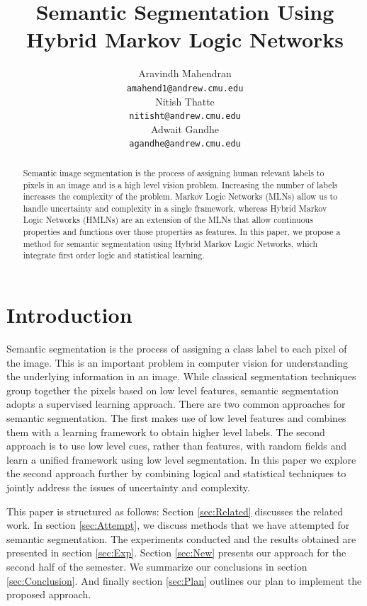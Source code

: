 \documentclass{article} %
\title{Semantic Segmentation Using Hybrid Markov Logic Networks}
\author{
Aravindh Mahendran \\
\texttt{amahend1@andrew.cmu.edu} \\ 
\And
Nitish Thatte \\
\texttt{nitisht@andrew.cmu.edu} \\
\AND
Adwait Gandhe \\
\texttt{agandhe@andrew.cmu.edu} \\
}
\begin{document}
\maketitle

\begin{abstract}
Semantic image segmentation is the process of assigning human relevant labels to pixels in an image and is a high level vision problem. Increasing the number of labels increases the complexity of the problem. Markov Logic Networks (MLNs) allow us to handle uncertainty and complexity in a single framework, whereas Hybrid Markov Logic Networks (HMLNs) are an extension of the MLNs that allow continuous properties and functions over those properties as features.  In this paper, we propose a method for semantic segmentation using Hybrid Markov Logic Networks, which integrate first order logic and statistical learning.  
\end{abstract}


\section{Introduction}
\label{sec:Intro}
Semantic segmentation is the process of assigning a class label to each pixel of the image. This is an important problem in computer vision for understanding the underlying information in an image. While classical segmentation techniques group together the pixels based on low level features, semantic segmentation adopts a supervised learning approach. There are two common approaches for semantic segmentation. The first makes use of low level features and combines them with a learning framework to obtain higher level labels. The second approach is to use low level cues, rather than features, with random fields and learn a unified framework using low level segmentation. In this paper we explore the second approach further by combining logical and statistical techniques to jointly address the issues of uncertainty and complexity. 

This paper is structured as follows: Section \ref{sec:Related} discusses the related work. In section \ref{sec:Attempt}, we discuss methods that we have attempted for semantic segmentation. The experiments conducted and the results obtained are presented in section \ref{sec:Exp}. Section \ref{sec:New} presents our approach for the second half of the semester. We summarize our conclusions in section \ref{sec:Conclusion}. And finally section \ref{sec:Plan} outlines our plan to implement the proposed approach.
\end{document}
